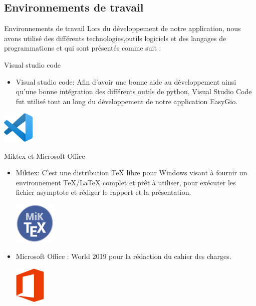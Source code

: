 \documentclass{beamer}
\begin{document}
\subsection{Environnements de travail}
\begin{frame}{Environnements de travail}
Lors du développement de notre application, nous avons utilisé des différents technologies,outils logiciels et des langages de programmations et qui sont présentés comme suit :
\end{frame}
\begin{frame}{Visual studio code}
\begin{itemize}
\item Visual studio code: Afin d’avoir une bonne aide au développement ainsi qu’une bonne intégration des différents outils de python, Visual Studio Code fut utilisé tout au long du développement de notre application EasyGio.
\end{itemize}
 \begin{center}
     \includegraphics[width=1.5cm]{pic/Visual Studio Code logo.png}
 \end{center}
\end{frame}
\begin{frame}{Miktex et Microsoft Office }
\begin{itemize}
\item Miktex: C'est une distribution TeX libre pour Windows visant à fournir un environnement TeX/LaTeX complet et prêt à utiliser, pour exécuter les fichier asymptote et rédiger le rapport et la présentation.
\begin{center}
    \includegraphics[width=2cm]{pic/Miktex.png}
\end{center}\pause
\item Microsoft Office : World 2019 pour la rédaction du cahier des charges.
\begin{center}
    \includegraphics[width=1.5cm]{pic/Microsoft Office.png}
\end{center}
\end{itemize}
\end{frame}
\end{document}
